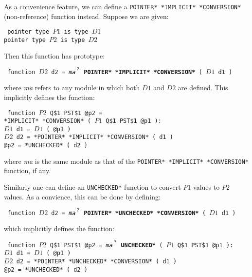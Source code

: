 \documentclass[12pt]{article}
\newcommand{\QMARK}{{$^{\,\mbox{\footnotesize ?}}$}}
\newcommand{\ttkey}[1]{{\tt \bfseries #1}}
\newenvironment{indpar}[1][0.3in]%
	{\begin{list}{}%
		     {\setlength{\itemsep}{0in}%
		      \setlength{\topsep}{0in}%
		      \setlength{\parsep}{1ex}%
		      \setlength{\labelwidth}{#1}%
		      \setlength{\leftmargin}{#1}%
		      \addtolength{\leftmargin}{\labelsep}}%
	 \item}%
	{\end{list}}
\begin{document}
As a convenience feature, we can define a
{\tt *POINTER* *IMPLICIT* *CONVERSION*} (non-reference) function instead.
 Suppose we are given:
\begin{indpar} \tt
pointer type $P1$ is type $D1$ \\
pointer type $P2$ is type $D2$
\end{indpar}
Then this function has prototype:
\begin{indpar}\label{POINTER-IMPLICIT-CONVERSION} \tt
function $D2$ d2 = {\em ma}\QMARK{} \ttkey{*POINTER* *IMPLICIT* *CONVERSION*}
                  ( $D1$ d1 )
\end{indpar}
where {\em ma} refers to any module in which both $D1$ and $D2$ are defined.
This implicitly defines the function:
\begin{indpar} \tt
function $P2$ Q\$1 PST\$1 @p2 = \\
\hspace*{1in}{\em ma}\QMARK{} *IMPLICIT* *CONVERSION*
			( $P1$ Q\$1 PST\$1 @p1 ): \\
\hspace*{0.3in}$D1$ d1 = $D1$ ( @p1 ) \\
\hspace*{0.3in}$D2$ d2 = *POINTER* *IMPLICIT* *CONVERSION* ( d1 ) \\
\hspace*{0.3in}@p2 = *UNCHECKED* ( d2 )
\end{indpar}
where {\em ma} is the same module as that of the
{\tt *POINTER* *IMPLICIT* *CONVERSION*} function, if any.

Similarly one can define an {\tt *UNCHECKED*} function to convert
$P1$ values to $P2$ values.  As a convience, this can be
done by defining:
\begin{indpar} \tt
function $D2$ d2 = {\em ma}\QMARK{}  \ttkey{*POINTER* *UNCHECKED* *CONVERSION*}
			( $D1$ d1 )
\end{indpar}
which implicitly defines the function:
\begin{indpar} \tt
function $P2$ Q\$1 PST\$1 @p2 = {\em ma}\QMARK{} \ttkey{*UNCHECKED*}
	( $P1$ Q\$1 PST\$1 @p1 ): \\
\hspace*{0.3in}$D1$ d1 = $D1$ ( @p1 ) \\
\hspace*{0.3in}$D2$ d2 = *POINTER* *UNCHECKED* *CONVERSION* ( d1 ) \\
\hspace*{0.3in}@p2 = *UNCHECKED* ( d2 )
\end{indpar}
\end{document}
